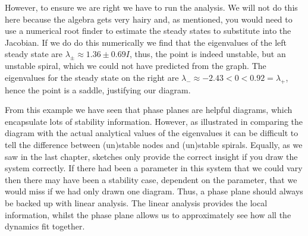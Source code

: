 \begin{example}[frametitle=Derivative signs]
{However, to ensure we are right we have to run the analysis. We will not do this here because the algebra gets very hairy and, as mentioned, you would need to use a numerical root finder to estimate the steady states to substitute into the Jacobian. If we do do this numerically we find that the eigenvalues of the left steady state are $\lambda_\pm\approx 1.36\pm0.69I$, thus, the point is indeed unstable, but an unstable spiral, which we could not have predicted from the graph. The eigenvalues for the steady state on the right are $\lambda_-\approx -2.43<0<0.92=\lambda_+$, hence the point is a saddle, justifying our diagram.}
\end{example}

From this example we have seen that phase planes are helpful diagrams, which encapsulate lots of stability information. However, as illustrated in comparing the diagram with the actual analytical values of the eigenvalues it can be difficult to tell the difference between (un)stable nodes and (un)stable spirals. Equally, as we saw in the last chapter, sketches only provide the correct insight if you draw the system correctly. If there had been a parameter in this system that we could vary then there may have been a stability case, dependent on the parameter, that we would miss if we had only drawn one diagram. Thus, a phase plane should always be backed up with linear analysis. The linear analysis provides the local information, whilst the phase plane allows us to approximately see how all the dynamics fit together.

